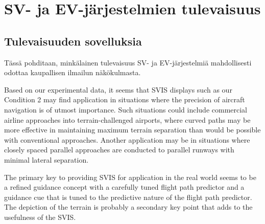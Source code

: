 \documentclass[utf8,bachelor,manualbib]{gradu3}
\begin{document}
\chapter{SV- ja EV-järjestelmien tulevaisuus}

\section{Tulevaisuuden sovelluksia}

Tässä pohditaan, minkälainen tulevaisuus SV- ja EV-järjestelmiä mahdollisesti odottaa kaupallisen ilmailun näkökulmasta.

Based on our experimental data, it seems that SVIS displays such as our Condition
2 may find application in situations where the precision of aircraft navigation is of
utmost importance. Such situations could include commercial airline approaches
into terrain-challenged airports, where curved paths may be more effective in
maintaining maximum terrain separation than would be possible with conventional
approaches. Another application may be in situations where closely spaced
parallel approaches are conducted to parallel runways with minimal lateral separation. \citep{schnell2004}

The primary key to
providing SVIS for application in the real world seems to be a refined guidance
concept with a carefully tuned flight path predictor and a guidance cue that is tuned
to the predictive nature of the flight path predictor. The depiction of the terrain is
probably a secondary key point that adds to the usefulness of the SVIS. \citep{schnell2004}
\end{document}
